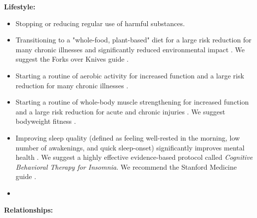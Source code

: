\documentclass[12pt,letterpaper]{article}
\begin{document}
\vspace{\baselineskip}
\noindent \textbf{Lifestyle:}
\begin{itemize}
    \item Stopping or reducing regular use of harmful substances.
    \item Transitioning to a "whole-food, plant-based" diet for a large risk reduction for many chronic illnesses and significantly reduced environmental impact \cite{WillettEATLancet}. We suggest the Forks over Knives guide \cite{forks}.  
    \item Starting a routine of aerobic activity for increased function and a large risk reduction for many chronic illnesses \cite{liebermanExercised}. 
    \item Starting a routine of whole-body muscle strengthening for increased function and a large risk reduction for acute and chronic injuries \cite{lauersenStrength}. We suggest bodyweight fitness \cite{lowBodyweight}.  
    \item Improving sleep quality (defined as feeling well-rested in the morning, low number of awakenings, and quick sleep-onset) significantly improves mental health \cite{scottSleep}. We suggest a highly effective evidence-based protocol called \textit{Cognitive Behavioral Therapy for Insomnia}. We recommend the Stanford Medicine guide \cite{stanfordSleep}.
    \item {}
\end{itemize}
\noindent \textbf{Relationships:}
\end{document}
